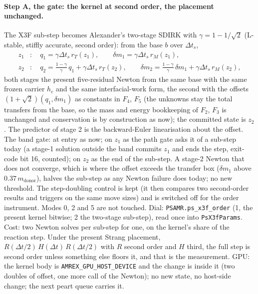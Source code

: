 \documentclass[11pt,a4paper]{article}
\newcommand{\code}[1]{\texttt{\small #1}}
\newcommand{\Dt}{\Delta t}
\begin{document}
\paragraph{Step A, the gate: the kernel at second order, the placement unchanged.}
The X3F sub-step becomes Alexander's two-stage SDIRK with
$\gamma = 1 - 1/\sqrt2$ (L-stable, stiffly accurate, second order):
from the base $b$ over $\Dt_s$,
\begin{align}
z_1&: \quad q_1 = \gamma\Dt_s\, r_T(z_1), \qquad
          \delta m_1 = \gamma\Dt_s\, r_M(z_1), \\
z_2&: \quad q_2 = \tfrac{1-\gamma}{\gamma}\, q_1 + \gamma\Dt_s\, r_T(z_2), \qquad
          \delta m_2 = \tfrac{1-\gamma}{\gamma}\,\delta m_1 + \gamma\Dt_s\, r_M(z_2),
\end{align}
both stages the present five-residual Newton from the same base with
the same frozen carrier $h_c$ and the same interfacial-work form, the
second with the offsets $(1+\sqrt2)(q_1, \delta m_1)$ as constants in
$F_4$, $F_5$ (the unknowns stay the total transfers from the base, so
the mass and energy bookkeeping of $F_2$, $F_3$ is unchanged and
conservation is by construction as now); the committed state is $z_2$.
The predictor of stage 2 is the backward-Euler linearisation about the
offset.  The band gate: at entry as now; on $z_1$ as the path gate asks
it of a sub-step today (a stage-1 solution outside the band commits
$z_1$ and ends the step, exit-code bit 16, counted); on $z_2$ as the
end of the sub-step.  A stage-2 Newton that does not converge, which is
where the offset exceeds the transfer box ($\delta m_1$ above
$0.37\,m_{\mathrm{donor}}$), halves the sub-step as any Newton failure
does today; no new threshold.  The step-doubling control is kept
(it then compares two second-order results and triggers on the same
move sizes) and is switched off for the order instrument.  Modes 0, 2
and 5 are not touched.  Dial: \code{PSAMR.ps\_x3f\_order} (1, the
present kernel bitwise; 2 the two-stage sub-step), read once into
\code{PsX3fParams}.  Cost: two Newton solves per sub-step for one, on
the kernel's share of the reaction step.  Under the present Strang
placement, $R(\Dt/2)\,H(\Dt)\,R(\Dt/2)$ with $R$ second order and $H$
third, the full step is second order unless something else floors it,
and that is the measurement.  GPU: the kernel body is
\code{AMREX\_GPU\_HOST\_DEVICE} and the change is inside it (two
doubles of offset, one more call of the Newton); no new state, no
host-side change; the next peart queue carries it.
\end{document}
